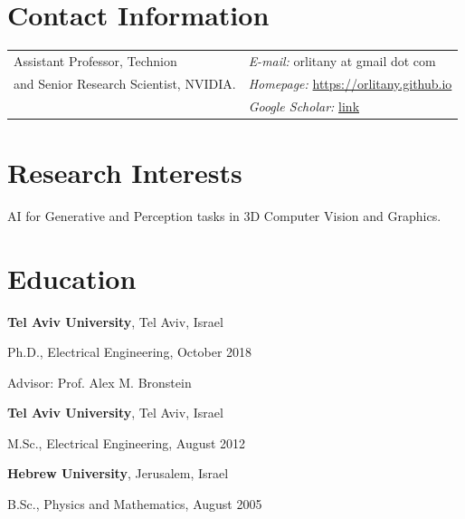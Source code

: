 \documentclass[margin,line]{res}
\newenvironment{list1}{
  \begin{list}{\ding{113}}{%
      \setlength{\itemsep}{0in}
      \setlength{\parsep}{0in} \setlength{\parskip}{0in}
      \setlength{\topsep}{0in} \setlength{\partopsep}{0in}
      \setlength{\leftmargin}{0.17in}}}{\end{list}}
\begin{document}

\begin{resume}
\section{\sc Contact Information}
\vspace{.05in}
\begin{tabular}{@{}p{2.5in}p{4in}}
Assistant Professor, Technion &  {\it E-mail:}  orlitany at gmail dot com \\
 and Senior Research Scientist, NVIDIA. &  {\it Homepage:} \url{https://orlitany.github.io} \\ 
 &  {\it Google Scholar:} \href{https://scholar.google.co.il/citations?user=Ihs8dwsAAAAJ&hl=en}{link}\\
\end{tabular}


\section{\sc Research Interests}
AI for Generative and Perception tasks in 3D Computer Vision and Graphics.

\section{\sc Education}
{\bf Tel Aviv University}, Tel Aviv, Israel\\
\vspace*{-.1in}
\begin{list1}
\item[] Ph.D., Electrical Engineering, October 2018
\item[] Advisor:  Prof. Alex M. Bronstein
\end{list1}


{\bf Tel Aviv University}, Tel Aviv, Israel\\
\vspace*{-.1in}
\begin{list1}
\item[] M.Sc., Electrical Engineering, August 2012
\end{list1}

{\bf Hebrew University}, Jerusalem, Israel\\
\vspace*{-.1in}
\begin{list1}
\item[] B.Sc., Physics and Mathematics,  August 2005


\end{list1}
\end{resume}
\end{document}
